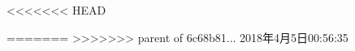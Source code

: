 \documentclass[refcompress,eversion,noinfo]{XDUthesis}
\begin{document}
\XDUfrontmatter
%
%
%
%
%

<<<<<<< HEAD


\XDUbackmatter{}


=======
%
%
%
%
>>>>>>> parent of 6c68b81... 2018年4月5日00:56:35
\end{document}
